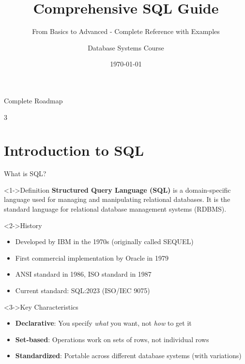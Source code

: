 \documentclass[aspectratio=169,11pt]{beamer}
\title{Comprehensive SQL Guide}
\subtitle{From Basics to Advanced - Complete Reference with Examples}
\author{Database Systems Course}
\institute{CS Department}
\date{\today}
\begin{document}
\begin{frame}
\titlepage
\end{frame}

\begin{frame}{Complete Roadmap}
\begin{multicols}{3}
\tableofcontents
\end{multicols}
\end{frame}

\section{Introduction to SQL}

\begin{frame}{What is SQL?}
\begin{block}<1->{Definition}
\textbf{Structured Query Language (SQL)} is a domain-specific language used for managing and manipulating relational databases. It is the standard language for relational database management systems (RDBMS).
\end{block}

\pause
\begin{exampleblock}<2->{History}
\begin{itemize}
    \item Developed by IBM in the 1970s (originally called SEQUEL)
    \item First commercial implementation by Oracle in 1979
    \item ANSI standard in 1986, ISO standard in 1987
    \item Current standard: SQL:2023 (ISO/IEC 9075)
\end{itemize}
\end{exampleblock}

\pause
\begin{alertblock}<3->{Key Characteristics}
\begin{itemize}
    \item \textbf{Declarative}: You specify \textit{what} you want, not \textit{how} to get it
    \item \textbf{Set-based}: Operations work on sets of rows, not individual rows
    \item \textbf{Standardized}: Portable across different database systems (with variations)
\end{itemize}
\end{alertblock}
\end{frame}
\end{document}
